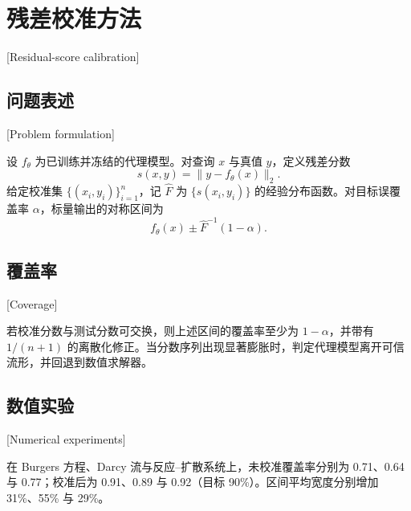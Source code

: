 \chapter{残差校准方法}[Residual-score calibration]

\section{问题表述}[Problem formulation]

设 $f_\theta$ 为已训练并冻结的代理模型。对查询 $x$ 与真值 $y$，定义残差分数
\begin{equation}
  s(x,y)=\|y-f_\theta(x)\|_2.
\end{equation}
给定校准集 $\{(x_i,y_i)\}_{i=1}^{n}$，记 $\hat F$ 为 $\{s(x_i,y_i)\}$ 的经验分布函数。对目标误覆盖率 $\alpha$，标量输出的对称区间为
\begin{equation}
  f_\theta(x)\pm \hat F^{-1}(1-\alpha).
\end{equation}

\section{覆盖率}[Coverage]

若校准分数与测试分数可交换，则上述区间的覆盖率至少为 $1-\alpha$，并带有 $1/(n+1)$ 的离散化修正。当分数序列出现显著膨胀时，判定代理模型离开可信流形，并回退到数值求解器。

\section{数值实验}[Numerical experiments]

在 Burgers 方程、Darcy 流与反应--扩散系统上，未校准覆盖率分别为 0.71、0.64 与 0.77；校准后为 0.91、0.89 与 0.92（目标 90\%）。区间平均宽度分别增加 31\%、55\% 与 29\%。
